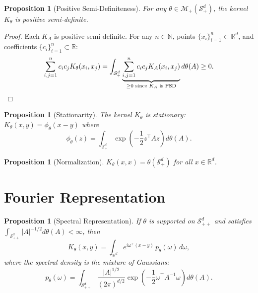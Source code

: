 \documentclass[11pt]{article}
\newtheorem{proposition}[theorem]{Proposition}
\theoremstyle{definition}
\newcommand{\R}{\mathbb{R}}
\newcommand{\N}{\mathbb{N}}
\newcommand{\Splus}{\mathcal{S}_+^d}
\newcommand{\Splusplus}{\mathcal{S}_{++}^d}
\newcommand{\M}{\mathcal{M}}
\begin{document}
\begin{proposition}[Positive Semi-Definiteness]
\label{prop:psd}
For any $\theta \in \M_+(\Splus)$, the kernel $K_\theta$ is positive semi-definite.
\end{proposition}

\begin{proof}
Each $K_A$ is positive semi-definite. For any $n \in \N$, points $\{x_i\}_{i=1}^n \subset \R^d$, and coefficients $\{c_i\}_{i=1}^n \subset \R$:
\begin{equation}
    \sum_{i,j=1}^n c_i c_j K_\theta(x_i, x_j) 
    = \int_{\Splus} \underbrace{\sum_{i,j=1}^n c_i c_j K_A(x_i, x_j)}_{\geq 0 \text{ since } K_A \text{ is PSD}} d\theta(A) \geq 0. \qedhere
\end{equation}
\end{proof}

\begin{proposition}[Stationarity]
\label{prop:stationary}
The kernel $K_\theta$ is stationary: $K_\theta(x, y) = \phi_\theta(x - y)$ where
\begin{equation}
    \phi_\theta(z) = \int_{\Splus} \exp\left(-\frac{1}{2} z^\top A z\right) d\theta(A).
\end{equation}
\end{proposition}

\begin{proposition}[Normalization]
$K_\theta(x, x) = \theta(\Splus)$ for all $x \in \R^d$.
\end{proposition}

\section{Fourier Representation}

\begin{proposition}[Spectral Representation]
\label{prop:fourier}
If $\theta$ is supported on $\Splusplus$ and satisfies $\int_{\Splusplus} |A|^{-1/2} d\theta(A) < \infty$, then
\begin{equation}
    K_\theta(x, y) = \int_{\R^d} e^{i\omega^\top(x-y)} \, p_\theta(\omega) \, d\omega,
\end{equation}
where the \emph{spectral density} is the mixture of Gaussians:
\begin{equation}
    p_\theta(\omega) = \int_{\Splusplus} \frac{|A|^{1/2}}{(2\pi)^{d/2}} \exp\left(-\frac{1}{2}\omega^\top A^{-1} \omega\right) d\theta(A).
\end{equation}
\end{proposition}
\end{document}
